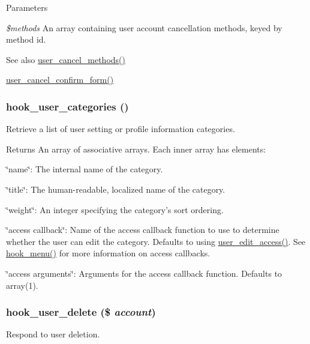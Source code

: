 \begin{DoxyParams}{Parameters}
\item[{\em \$methods}]An array containing user account cancellation methods, keyed by method id.\end{DoxyParams}
\begin{DoxySeeAlso}{See also}
\hyperlink{user_8pages_8inc_a11f0201b4e77086622c55fd3ed13bb93}{user\_\-cancel\_\-methods()} 

\hyperlink{group__forms_ga75a9df042449e7fc294c418083052114}{user\_\-cancel\_\-confirm\_\-form()} 
\end{DoxySeeAlso}
\hypertarget{group__hooks_ga166a3fe9d203a99560d10413a880ed08}{
\subsubsection[{hook\_\-user\_\-categories}]{\setlength{\rightskip}{0pt plus 5cm}hook\_\-user\_\-categories ()}}
\label{group__hooks_ga166a3fe9d203a99560d10413a880ed08}
Retrieve a list of user setting or profile information categories.

\begin{DoxyReturn}{Returns}
An array of associative arrays. Each inner array has elements:
\begin{DoxyItemize}
\item \char`\"{}name\char`\"{}: The internal name of the category.
\item \char`\"{}title\char`\"{}: The human-\/readable, localized name of the category.
\item \char`\"{}weight\char`\"{}: An integer specifying the category's sort ordering.
\item \char`\"{}access callback\char`\"{}: Name of the access callback function to use to determine whether the user can edit the category. Defaults to using \hyperlink{user_8module_a9d988b07d458af21fe4e11868052b345}{user\_\-edit\_\-access()}. See \hyperlink{group__hooks_ga5c95244fea59b25666e409759e133ded}{hook\_\-menu()} for more information on access callbacks.
\item \char`\"{}access arguments\char`\"{}: Arguments for the access callback function. Defaults to array(1). 
\end{DoxyItemize}
\end{DoxyReturn}
\hypertarget{group__hooks_ga2c0755857e486e8a770b44b496da9929}{
\subsubsection[{hook\_\-user\_\-delete}]{\setlength{\rightskip}{0pt plus 5cm}hook\_\-user\_\-delete (\$ {\em account})}}
\label{group__hooks_ga2c0755857e486e8a770b44b496da9929}
Respond to user deletion.

